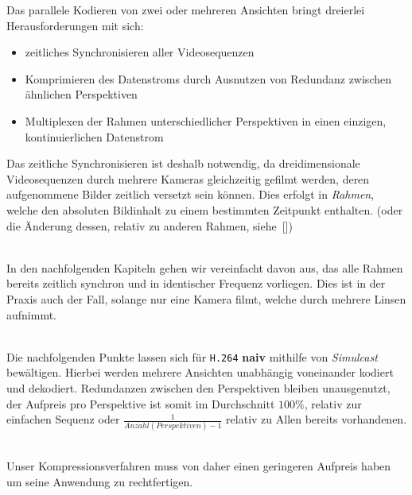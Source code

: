 Das parallele Kodieren von zwei oder mehreren Ansichten bringt dreierlei Herausforderungen mit sich:
\begin{itemize}
    \item zeitliches Synchronisieren aller Videosequenzen
    \item Komprimieren des Datenstroms durch Ausnutzen von Redundanz zwischen \"ahnlichen Perspektiven
    \item Multiplexen der Rahmen unterschiedlicher Perspektiven in einen einzigen, kontinuierlichen Datenstrom
\end{itemize}

\noindent Das zeitliche Synchronisieren ist deshalb notwendig, da dreidimensionale Videosequenzen durch mehrere Kameras
gleichzeitig gefilmt werden, deren aufgenommene Bilder zeitlich versetzt sein k\"onnen.
Dies erfolgt in \textit{Rahmen}, welche den absoluten Bildinhalt zu einem bestimmten Zeitpunkt enthalten.
(oder die \"Anderung dessen, relativ  zu anderen Rahmen, siehe~[\texttt{}])

\noindent\\ In den nachfolgenden Kapiteln gehen wir vereinfacht davon aus, das alle Rahmen bereits zeitlich synchron und in
identischer Frequenz vorliegen.
Dies ist in der Praxis auch der Fall, solange nur eine Kamera filmt, welche durch mehrere Linsen aufnimmt.

\noindent\\ Die nachfolgenden Punkte lassen sich f\"ur \texttt{H.264} \textbf{naiv} mithilfe von
\textit{Simulcast}~\cite{simulcast} bew\"altigen.
Hierbei werden mehrere Ansichten unabh\"angig voneinander kodiert und dekodiert.
Redundanzen zwischen den Perspektiven bleiben unausgenutzt, der Aufpreis pro Perspektive ist somit im Durchschnitt
$100\%$, relativ zur einfachen Sequenz oder $\frac{1}{Anzahl(Perspektiven) - 1}$ relativ zu Allen bereits vorhandenen.

\noindent\\ Unser Kompressionsverfahren muss von daher einen geringeren Aufpreis haben um seine Anwendung zu
rechtfertigen.
